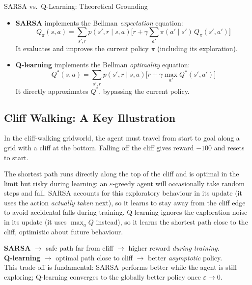 \documentclass[11pt,a4paper]{article}
\begin{document}
\begin{thmbox}{SARSA vs.\ Q-Learning: Theoretical Grounding}
\begin{itemize}
  \item \textbf{SARSA} implements the Bellman \emph{expectation} equation:
  \[Q_\pi(s,a)=\textstyle\sum_{s',r}p(s',r\mid s,a)\bigl[r+\gamma\sum_{a'}\pi(a'\mid s')\,Q_\pi(s',a')\bigr]\]
  It evaluates and improves the current policy $\pi$ (including its exploration).

  \item \textbf{Q-learning} implements the Bellman \emph{optimality} equation:
  \[Q^*(s,a)=\textstyle\sum_{s',r}p(s',r\mid s,a)\bigl[r+\gamma\max_{a'}Q^*(s',a')\bigr]\]
  It directly approximates $Q^*$, bypassing the current policy.
\end{itemize}
\end{thmbox}

\subsection{Cliff Walking: A Key Illustration}

In the cliff-walking gridworld, the agent must travel from start to goal along a grid with a cliff at the bottom. Falling off the cliff gives reward $-100$ and resets to start.

The shortest path runs directly along the top of the cliff and is optimal in the limit but risky during learning: an $\varepsilon$-greedy agent will occasionally take random steps and fall. SARSA accounts for this exploratory behaviour in its update (it uses the action \emph{actually taken} next), so it learns to stay away from the cliff edge to avoid accidental falls during training. Q-learning ignores the exploration noise in its update (it uses $\max_a Q$ instead), so it learns the shortest path close to the cliff, optimistic about future behaviour.

\begin{tcolorbox}[colback=LightBlue,colframe=AccentBlue,boxrule=0.8pt,arc=3pt]
\textbf{SARSA} $\to$ safe path far from cliff $\to$ higher reward \emph{during training}.\\
\textbf{Q-learning} $\to$ optimal path close to cliff $\to$ better \emph{asymptotic} policy.\\[4pt]
This trade-off is fundamental: SARSA performs better while the agent is still exploring; Q-learning converges to the globally better policy once $\varepsilon\to 0$.
\end{tcolorbox}
\end{document}
